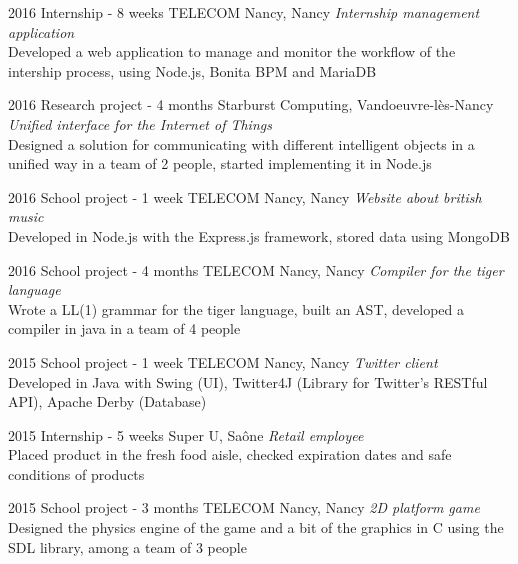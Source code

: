 \documentclass[]{lemaki-cv}
\begin{document}
		\begin{entrylist}


			\entry
			{2016}
			{Internship {\normalfont - 8 weeks}}
			{TELECOM Nancy, Nancy}
			{\emph{Internship management application} \\
			Developed a web application to manage and monitor the workflow of
			the intership process, using Node.js, Bonita BPM and MariaDB}


			\entry
			{2016}
			{Research project {\normalfont - 4 months}}
			{Starburst Computing, Vandoeuvre-lès-Nancy}
			{\emph{Unified interface for the Internet of Things} \\
			Designed a solution for communicating with different intelligent
			objects in a unified way in a team of 2 people, started implementing
			it in Node.js}


			\entry
			{2016}
			{School project {\normalfont - 1 week}}
			{TELECOM Nancy, Nancy}
			{\emph{Website about british music} \\
			Developed in Node.js with the Express.js framework, stored data
			using MongoDB}


			\entry
			{2016}
			{School project {\normalfont - 4 months}}
			{TELECOM Nancy, Nancy}
			{\emph{Compiler for the tiger language} \\
			Wrote a LL(1) grammar for the tiger language, built an AST,
			developed a compiler in java in a team of 4 people}


			\entry
			{2015}
			{School project {\normalfont - 1 week}}
			{TELECOM Nancy, Nancy}
			{\emph{Twitter client} \\
			Developed in Java with Swing (UI), Twitter4J (Library for Twitter's
			RESTful API), Apache Derby (Database)}


			\entry
			{2015}
			{Internship {\normalfont - 5 weeks}}
			{Super U, Saône}
			{\emph{Retail employee} \\
			Placed product in the fresh food aisle, checked expiration dates and
			safe conditions of products}


			\entry
			{2015}
			{School project {\normalfont - 3 months}}
			{TELECOM Nancy, Nancy}
			{\emph{2D platform game} \\
			Designed the physics engine of the game and a bit of the graphics in
			C using the SDL library, among a team of 3 people}


		\end{entrylist}
	
\end{document}
